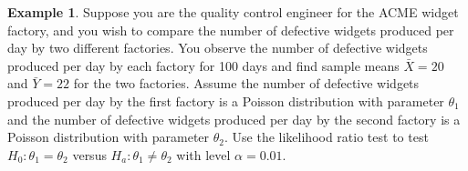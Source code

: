 \documentclass[12pt]{article}
\theoremstyle{definition}
\newtheorem*{example}{Example}
\theoremstyle{remark}
\begin{document}
\begin{example}
Suppose you are the quality control engineer for the ACME widget factory, and you wish to compare the number of defective widgets produced per day by two different factories. You observe the number of defective widgets produced per day by each factory for 100 days and find sample means $\bar{X} = 20$ and $\bar{Y} = 22$ for the two factories. Assume the number of defective widgets produced per day by the first factory is a Poisson distribution with parameter $\theta_1$ and the number of defective widgets produced per day by the second factory is a Poisson distribution with parameter $\theta_2$. Use the likelihood ratio test to test $H_0: \theta_1 = \theta_2$ versus $H_a: \theta_1 \neq \theta_2$ with level $\alpha = 0.01$.\\


\end{example}
\end{document}
